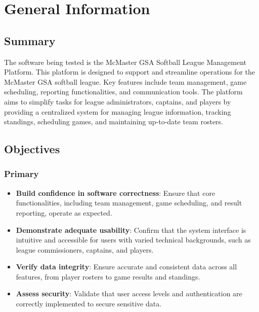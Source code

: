 \documentclass[12pt, titlepage]{article}
\begin{document}
\section{General Information}

\subsection{Summary}

The software being tested is the McMaster GSA Softball League Management Platform. This platform is designed to support and streamline operations for the McMaster GSA softball league. Key features include team management, game scheduling, reporting functionalities, and communication tools. The platform aims to simplify tasks for league administrators, captains, and players by providing a centralized system for managing league information, tracking standings, scheduling games, and maintaining up-to-date team rosters.

\subsection{Objectives}

\subsubsection*{Primary}
\begin{itemize}
    \item \textbf{Build confidence in software correctness}: Ensure that core functionalities, including team management, game scheduling, and result reporting, operate as expected.
    \item \textbf{Demonstrate adequate usability}: Confirm that the system interface is intuitive and accessible for users with varied technical backgrounds, such as league commissioners, captains, and players.
    \item \textbf{Verify data integrity}: Ensure accurate and consistent data across all features, from player rosters to game results and standings.
    \item \textbf{Assess security}: Validate that user access levels and authentication are correctly implemented to secure sensitive data.
\end{itemize}
\end{document}
